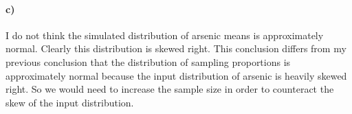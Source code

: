 \documentclass[12pt]{article}
\begin{document}
\paragraph{c)}

I do not think the simulated distribution of arsenic means is approximately normal.
Clearly this distribution is skewed right. This conclusion differs from my previous
conclusion that the distribution of sampling proportions is approximately normal because
the input distribution of arsenic is heavily skewed right. So we would need to increase
the sample size in order to counteract the skew of the input distribution.
\end{document}
